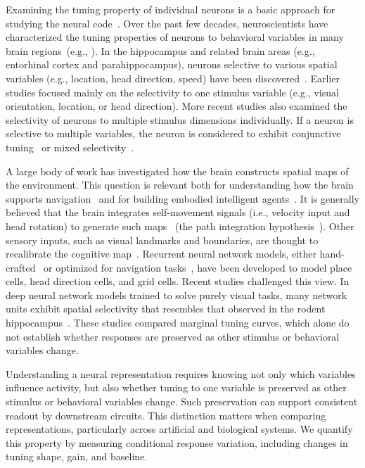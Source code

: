 \documentclass[11pt]{article}
\begin{document}
Examining the tuning property of individual neurons is a basic approach for studying the neural code~\cite{Hubel1959,o1971,Hafting2005,Deangelis1991,decharms2000neural,Stensola2012,Kriegeskorte2021}. Over the past few decades, neuroscientists have characterized the tuning properties of neurons to behavioral variables in many brain regions~(e.g., \cite{Hafting2005,Deangelis1991,decharms2000neural,Stensola2012,Taube1990}).
In the hippocampus and related brain areas (e.g., entorhinal cortex and parahippocampus), neurons selective to various spatial variables (e.g., location, head direction, speed) have been discovered~\cite{o1971,o1978,Hafting2005,Stensola2012,Kropff2015speed,Taube1990}. Earlier studies focused mainly on the selectivity to one stimulus variable (e.g., visual orientation, location, or head direction). More recent studies also examined the selectivity of neurons to multiple stimulus dimensions individually. If a neuron is selective to multiple variables, the neuron is considered to exhibit conjunctive tuning~\cite{Sargolini2006conjunctive} or mixed selectivity~\cite{Rigotti2013,Fusi2016neurons,Hardcastle2017multiplexed}.

A large body of work has investigated how the brain constructs spatial maps of the environment. This question is relevant both for understanding how the brain supports navigation~\cite{Mcnaughton2006} and for building embodied intelligent agents~\cite{Cadena2017}.
It is generally believed that the brain integrates self-movement signals (i.e., velocity input and head rotation) to generate such maps~\cite{Mcnaughton2006} (the path integration hypothesis~\cite{Darwin1873}). Other sensory inputs, such as visual landmarks and boundaries, are thought to recalibrate the cognitive map~\cite{Hardcastle2015environmental,Zhang1996}. Recurrent neural network models, either hand-crafted~\cite{Samsonovich1997,Zhang1996,Burak2009} or optimized for navigation tasks~\cite{Cueva2018,Banino2018,Sorscher2020,Cueva2020,Gao2021}, have been developed to model place cells, head direction cells, and grid cells.
Recent studies challenged this view. In deep neural network models trained to solve purely visual tasks, many network units exhibit spatial selectivity that resembles that observed in the rodent hippocampus~\cite{Gornet2024automated,Luo2024}.
These studies compared marginal tuning curves, which alone do not establish whether responses are preserved as other stimulus or behavioral variables change.

Understanding a neural representation requires knowing not only which variables influence activity, but also whether tuning to one variable is preserved as other stimulus or behavioral variables change. Such preservation can support consistent readout by downstream circuits. This distinction matters when comparing representations, particularly across artificial and biological systems. We quantify this property by measuring conditional response variation, including changes in tuning shape, gain, and baseline.
\end{document}
